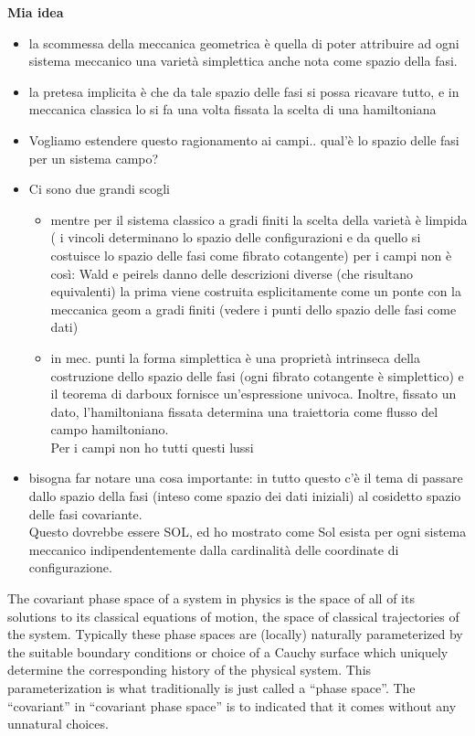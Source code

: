 \documentclass[Main]{subfiles}
\begin{document}
\begin{Warning}
	\textbf{Mia idea}
	\begin{itemize}
		\item la scommessa della meccanica geometrica è quella di poter attribuire ad ogni sistema meccanico una varietà simplettica anche nota come spazio della fasi.
		\item la pretesa implicita è che da tale spazio delle fasi si possa ricavare tutto, e in meccanica classica lo si fa una volta fissata la scelta di una hamiltoniana
		\item Vogliamo estendere questo ragionamento ai campi.. qual'è lo spazio delle fasi per un sistema campo?
		\item Ci sono due grandi scogli
			\begin{itemize}
				\item mentre per il sistema classico a gradi finiti la scelta della varietà è limpida ( i vincoli determinano lo spazio delle configurazioni e da quello si costuisce lo spazio delle fasi come fibrato cotangente) per i campi non è così: Wald e peirels danno delle descrizioni diverse (che risultano equivalenti) la prima viene costruita esplicitamente come un ponte  con la meccanica geom a gradi finiti (vedere i punti dello spazio delle fasi come dati)
				\item in mec. punti la forma simplettica è una proprietà intrinseca della costruzione dello spazio delle fasi (ogni fibrato cotangente è simplettico) e il teorema di darboux fornisce un'espressione univoca.
					Inoltre, fissato un dato, l'hamiltoniana fissata determina una traiettoria come flusso del campo hamiltoniano.\\
					Per i campi non ho tutti questi lussi				
			\end{itemize}
		\item bisogna far notare una cosa importante: in tutto questo c'è il tema di passare dallo spazio della fasi (inteso come spazio dei dati iniziali) al cosidetto spazio delle fasi covariante.\\
			Questo dovrebbe essere SOL, ed ho mostrato come Sol esista per ogni sistema meccanico indipendentemente dalla cardinalità delle coordinate di configurazione.
	\end{itemize}
	
		
	\end{Warning}	
\fi
	
	

	The covariant phase space of a system in physics is the space of all of its solutions to its classical equations of motion, the space of classical trajectories of the system. 
 Typically these phase spaces are (locally) naturally parameterized by the suitable boundary conditions or choice of a Cauchy surface which uniquely determine the corresponding history of the physical system. This parameterization is what traditionally is just called a “phase space”. 
	The “covariant” in “covariant phase space” is to indicated that it comes without any unnatural choices.
	
\end{document}
